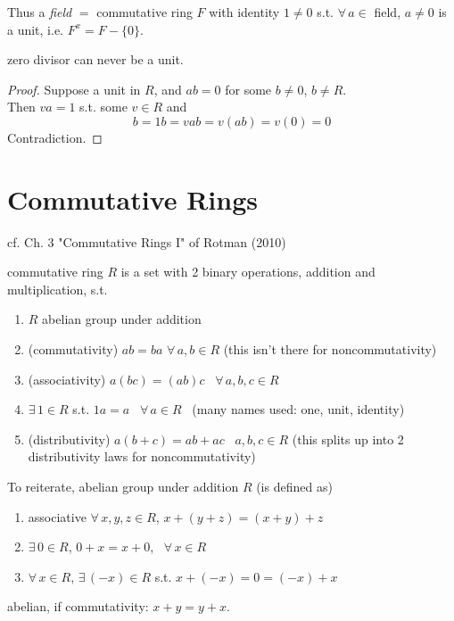 Thus a \emph{field} $= $ commutative ring $F$ with identity $1\neq 0$ s.t. $\forall \, a\in $ field, $a\neq 0$ is a unit, i.e. $F^x = F - \lbrace 0 \rbrace$. 

\begin{proposition}
	zero divisor can never be a unit. 
\end{proposition}

\begin{proof}
	Suppose a unit in $R$, and $ab=0$ for some $b\neq 0$, $b\neq R$. \\
	Then $va=1$ s.t. some $v\in R$ and 
	\[
	b =1b = vab = v(ab) = v(0) = 0
	\]
	Contradiction.
\end{proof} 	

\section{Commutative Rings}

cf. Ch. 3 "Commutative Rings I" of Rotman (2010) \cite{agat:JRotman2010}


\begin{definition} commutative ring $R$ is a set with 2 binary operations, addition and multiplication, s.t.
	\begin{enumerate}
		\item[(i)] $R$ abelian group under addition 
		\item[(ii)] (commutativity) $ab=ba$ \quad $\forall \, a,b \in R$  (this isn't there for noncommutativity)
		\item[(iii)] (associativity) $a(bc) = (ab)c$ \quad \, $\forall \, a,b,c\in R$
		\item[(iv)] $\exists \, 1 \in R$ s.t. $1a = a$ \, $\forall \, a  \in R$ \quad \, (many names used: one, unit, identity)
		\item[(v)] (distributivity) $a(b+c) = ab+ac$ \quad \, $a,b,c \in R$ (this splits up into 2 distributivity laws for noncommutativity)
	\end{enumerate}
\end{definition}

To reiterate, abelian group under addition $R$ (is defined as)
\begin{enumerate}
	\item associative $\forall \, x , y ,z \in R$, $x + (y+z) = (x+y)+z$ 
	\item $\exists \, 0 \in R$, $0+x = x + 0$, \, $\forall \, x \in R$ 
	\item $\forall \, x \in R$, $\exists \, (-x) \in R$ s.t. $x+(-x) = 0 = (-x) + x$
\end{enumerate}
abelian, if commutativity: $x+y=y+x$.  

